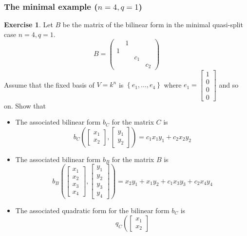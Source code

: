 \documentclass[12pt]{article}
\theoremstyle{definition}
\newtheorem{exercise}[theorem]{Exercise}
\newcommand{\lp}{\left(}
\newcommand{\rp}{\right)}
\newcommand{\lb}{\left\{}
\newcommand{\rb}{\right\}}
\begin{document}
\subsubsection{The minimal example ($n=4, q=1$)}

\begin{exercise}
Let $B$ be the matrix of the bilinear form in the minimal quasi-split case $n=4, q=1$. 
\[
	B =
	\begin{pmatrix}
		& 1 \\
		1 &  \\
		&& c_1 \\
		&&& c_2
	\end{pmatrix}
\]
Assume that the fixed basis of $V = k^n$ is $\lb e_1, \ldots, e_4 \rb$ where $e_1 = \begin{bmatrix}1 \\0 \\ 0 \\0 \end{bmatrix}$ and so on. Show that
\begin{itemize}
	\item The associated bilinear form $b_C$ for the matrix $C$ is
	\[
		b_C \lp \begin{bmatrix}
			x_1 \\
			x_2
		\end{bmatrix}
		,
		\begin{bmatrix}
			y_1 \\
			y_2
		\end{bmatrix}
		 \rp
		 = c_1 x_1 y_1 + c_2 x_2 y_2		 
	\]
	\item The associated bilinear form $b_B$ for the matrix $B$ is
	\[
		b_B
		\lp
		\begin{bmatrix}
			x_1 \\
			x_2 \\
			x_3 \\
			x_4 
		\end{bmatrix}
		,
		\begin{bmatrix}
			y_1 \\
			y_2 \\
			y_3 \\
			y_4 
		\end{bmatrix}
		\rp
		= x_2 y_1 + x_1 y_2 + c_1 x_3 y_3 + c_2 x_4 y_4
	\]
	\item The associated quadratic form for the bilinear form $b_C$ is
	\[
		q_C \lp
		\begin{bmatrix}
			x_1 \\
			x_2
		\end{bmatrix}
\]
\end{itemize}
\end{exercise}
\end{document}
